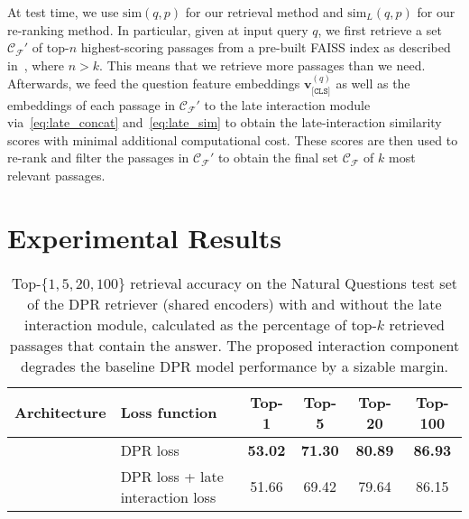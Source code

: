 %
At test time, we use $\text{sim}(q, p)$ for our retrieval method and $\text{sim}_L(q, p)$ for our re-ranking method.
%
In particular, given at input query $q$, we first retrieve a set $\mathcal{C_F}\prime$ of top-$n$ highest-scoring passages from a pre-built FAISS index as described in~, where $n > k$.
%
This means that we retrieve more passages than we need.
%
Afterwards, we feed the question feature embeddings $\mathbf{v}^{(q)}_{\texttt{[CLS]}}$ as well as the embeddings of each passage in $\mathcal{C_F}\prime$ to the late interaction module via~\eqref{eq:late_concat} and~\eqref{eq:late_sim} to obtain the late-interaction similarity scores with minimal additional computational cost.
%
These scores are then used to re-rank and filter the passages in $\mathcal{C_F}\prime$ to obtain the final set $\mathcal{C_F}$ of $k$ most relevant passages.


\section{Experimental Results}
\label{ch:late_interaction_results}


\begin{table*}[t!]
	\setlength\tabcolsep{5pt}
	\centering
	\small
	\begin{tabular}{ll|cccc}
		\toprule
		\textbf{Architecture} & \textbf{Loss function}
		& Top-1 & Top-5 & Top-20 & Top-100 \\ 
		\midrule
		 &
		DPR loss & \textbf{53.02} & \textbf{71.30} & \textbf{80.89} & \textbf{86.93} \\
		& DPR loss + late interaction loss & 51.66 & 69.42 & 79.64 & 86.15 \\
		\bottomrule
	\end{tabular}
	\caption[Top-$\{1, 5, 20, 100\}$ retrieval accuracy on the Natural Questions test set of the DPR retriever (shared encoders) with and without the late interaction module.]{
		Top-$\{1, 5, 20, 100\}$ retrieval accuracy on the Natural Questions test set of the DPR retriever (shared encoders) with and without the late interaction module, calculated as the percentage of top-$k$ retrieved passages that contain the answer.
		The proposed interaction component degrades the baseline DPR model performance by a sizable margin.
	}
	
	\label{tab:shared_encoders_results}
\end{table*}



